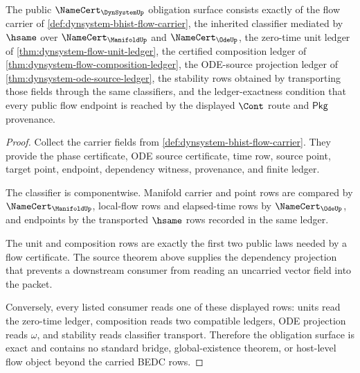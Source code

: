 \begin{theorem}
\label{thm:dynsystem-namecert-obligation-surface}
The public $\NameCert_{\DynSystemUp}$ obligation surface consists exactly of the flow carrier of \autoref{def:dynsystem-bhist-flow-carrier}, the inherited classifier mediated by $\hsame$ over $\NameCert_{\ManifoldUp}$ and $\NameCert_{\OdeUp}$, the zero-time unit ledger of \autoref{thm:dynsystem-flow-unit-ledger}, the certified composition ledger of \autoref{thm:dynsystem-flow-composition-ledger}, the ODE-source projection ledger of \autoref{thm:dynsystem-ode-source-ledger}, the stability rows obtained by transporting those fields through the same classifiers, and the ledger-exactness condition that every public flow endpoint is reached by the displayed $\Cont$ route and $\mathsf{Pkg}$ provenance.
\end{theorem}
\begin{proof}
Collect the carrier fields from \autoref{def:dynsystem-bhist-flow-carrier}. They provide the phase certificate, ODE source certificate, time row, source point, target point, endpoint, dependency witness, provenance, and finite ledger.

The classifier is componentwise. Manifold carrier and point rows are compared by $\NameCert_{\ManifoldUp}$, local-flow rows and elapsed-time rows by $\NameCert_{\OdeUp}$, and endpoints by the transported $\hsame$ rows recorded in the same ledger.

The unit and composition rows are exactly the first two public laws needed by a flow certificate. The source theorem above supplies the dependency projection that prevents a downstream consumer from reading an uncarried vector field into the packet.

Conversely, every listed consumer reads one of these displayed rows: units read the zero-time ledger, composition reads two compatible ledgers, ODE projection reads $\omega$, and stability reads classifier transport. Therefore the obligation surface is exact and contains no standard bridge, global-existence theorem, or host-level flow object beyond the carried BEDC rows.
\end{proof}

